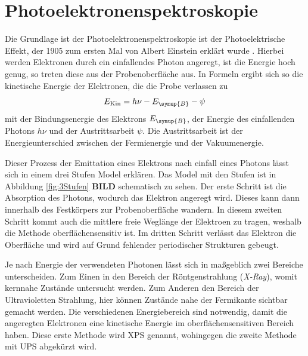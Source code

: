     
    \section{Photoelektronenspektroskopie} \label{sec:PES}
    Die Grundlage ist der Photoelektronenspektroskopie ist der Photoelektrische Effekt, der 1905 zum ersten Mal von Albert Einstein erklärt wurde \cite{Einstein}.
    Hierbei werden Elektronen durch ein einfallendes Photon angeregt, ist die Energie hoch genug, so treten diese aus der Probenoberfläche aus.
    In Formeln ergibt sich so die kinetische Energie der Elektronen, die die Probe verlassen zu 
    \begin{equation}
        E_{\text{Kin}} = h \nu - E_{\symup{B}} - \psi
        \label{eqn:Photoeffekt}
    \end{equation}
    mit der Bindungsenergie des Elektrons $E_{\symup{B}}$, der Energie des einfallenden Photons $h \nu$ und der Austrittsarbeit $\psi$.
    Die Austrittsarbeit ist der Energieunterschied zwischen der Fermienergie und der Vakuumenergie.

    Dieser Prozess der Emittation eines Elektrons nach einfall eines Photons lässt sich in einem drei Stufen Model erklären.
    Das Model mit den Stufen ist in Abbildung \ref{fig:3Stufen} \textbf{BILD} schematisch zu sehen.
    Der erste Schritt ist die Absorption des Photons, wodurch das Elektron angeregt wird. 
    Dieses kann dann innerhalb des Festkörpers zur Probenoberfläche wandern.
    In diesem zweiten Schritt kommt auch die mittlere freie Weglänge der Elektroen zu tragen, weshalb die Methode oberflächensensitiv ist.
    Im dritten Schritt verlässt das Elektron die Oberfläche und wird auf Grund fehlender periodischer Strukturen gebeugt.

    Je nach Energie der verwendeten Photonen lässt sich in maßgeblich zwei Bereiche unterscheiden.
    Zum Einen in den Bereich der Röntgenstrahlung (\textit{X-Ray}), womit kernnahe Zustände untersucht werden.
    Zum Anderen den Bereich der Ultravioletten Strahlung, hier können Zustände nahe der Fermikante sichtbar gemacht werden.
    Die verschiedenen Energiebereich sind notwendig, damit die angeregten Elektronen eine kinetische Energie im oberflächensensitiven Bereich haben.
    Diese erste Methode wird XPS genannt, wohingegen die zweite Methode mit UPS abgekürzt wird.


